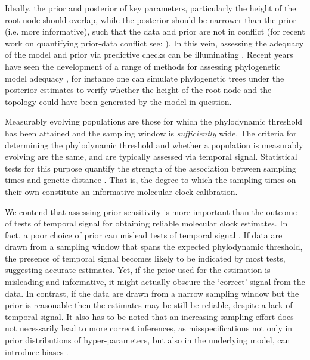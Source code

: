 \documentclass[11pt]{article}
\begin{document}
Ideally, the prior and posterior of key parameters, particularly the height of the root node should overlap, while the posterior should be narrower than the prior (i.e. more informative), such that the data and prior are not in conflict (for recent work on quantifying prior-data conflict see: \citealt{nott2020checking}). In this vein, assessing the adequacy of the model and prior via predictive checks can be illuminating \citep{mcelreath2018statistical}. Recent years have seen the development of a range of methods for assessing phylogenetic model adequacy \citep{duchene2019phylodynamic, mcelreath2018statistical, brown2018evaluating, duchene2018phylomad}, for instance one can simulate phylogenetic trees under the posterior estimates to verify whether the height of the root node and the topology could have been generated by the model in question. 

Measurably evolving populations are those for which the phylodynamic threshold has been attained and the sampling window is \textit{sufficiently} wide. The criteria for determining the phylodynamic threshold and whether a population is measurably evolving are the same, and are typically assessed via temporal signal. Statistical tests for this purpose quantify the strength of the association between sampling times and genetic distance \citep{rieux2016inferences, duchene2015performance, murray2016effect, featherstone2024clockor2, rambaut2016exploring}. That is, the degree to which the sampling times on their own constitute an informative molecular clock calibration. 

We contend that assessing prior sensitivity is more important than the outcome of tests of temporal signal for obtaining reliable molecular clock estimates. In fact, a poor choice of prior can mislead tests of temporal signal \citep{tay2024assessing}. If data are drawn from a sampling window that spans the expected phylodynamic threshold, the presence of temporal signal becomes likely to be indicated by most tests, suggesting accurate estimates. Yet, if the prior used for the estimation is misleading and informative, it might actually obscure the `correct' signal from the data. In contrast, if the data are drawn from a narrow sampling window but the prior is reasonable then the estimates may be still be reliable, despite a lack of temporal signal. It also has to be noted that an increasing sampling effort does not necessarily lead to more correct inferences, as misspecifications not only in prior distributions of hyper-parameters, but also in the underlying model, can introduce biases \citep{ferretti2024biased, moller2018impact}. 
\end{document}
